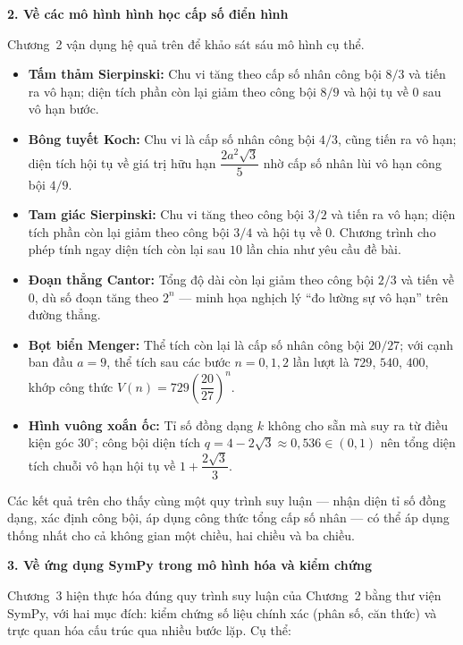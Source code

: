 \documentclass[12pt,a4paper,oneside]{book}
\theoremstyle{theorem}
\theoremstyle{definition}
\begin{document}
\vspace{0.4em}
\noindent\textbf{2. Về các mô hình hình học cấp số điển hình}

Chương~2 vận dụng hệ quả trên để khảo sát sáu mô hình cụ thể.

\begin{itemize}[leftmargin=1.5em, itemsep=3pt]
  \item \textbf{Tấm thảm Sierpinski:} Chu vi tăng theo cấp số nhân công bội $8/3$ và tiến ra vô hạn; diện tích phần còn lại giảm theo công bội $8/9$ và hội tụ về $0$ sau vô hạn bước.
  \item \textbf{Bông tuyết Koch:} Chu vi là cấp số nhân công bội $4/3$, cũng tiến ra vô hạn; diện tích hội tụ về giá trị hữu hạn $\dfrac{2a^2\sqrt{3}}{5}$ nhờ cấp số nhân lùi vô hạn công bội $4/9$.
  \item \textbf{Tam giác Sierpinski:} Chu vi tăng theo công bội $3/2$ và tiến ra vô hạn; diện tích phần còn lại giảm theo công bội $3/4$ và hội tụ về $0$. Chương trình cho phép tính ngay diện tích còn lại sau $10$ lần chia như yêu cầu đề bài.
  \item \textbf{Đoạn thẳng Cantor:} Tổng độ dài còn lại giảm theo công bội $2/3$ và tiến về $0$, dù số đoạn tăng theo $2^n$ --- minh họa nghịch lý ``đo lường sự vô hạn'' trên đường thẳng.
  \item \textbf{Bọt biển Menger:} Thể tích còn lại là cấp số nhân công bội $20/27$; với cạnh ban đầu $a=9$, thể tích sau các bước $n=0,1,2$ lần lượt là $729$, $540$, $400$, khớp công thức $V(n)=729\left(\dfrac{20}{27}\right)^n$.
  \item \textbf{Hình vuông xoắn ốc:} Tỉ số đồng dạng $k$ không cho sẵn mà suy ra từ điều kiện góc $30^\circ$; công bội diện tích $q=4-2\sqrt{3}\approx 0{,}536\in(0,1)$ nên tổng diện tích chuỗi vô hạn hội tụ về $1+\dfrac{2\sqrt{3}}{3}$.
\end{itemize}

Các kết quả trên cho thấy cùng một quy trình suy luận --- nhận diện tỉ số đồng dạng, xác định công bội, áp dụng công thức tổng cấp số nhân --- có thể áp dụng thống nhất cho cả không gian một chiều, hai chiều và ba chiều.

\vspace{0.4em}
\noindent\textbf{3. Về ứng dụng SymPy trong mô hình hóa và kiểm chứng}

Chương~3 hiện thực hóa đúng quy trình suy luận của Chương~2 bằng thư viện SymPy, với hai mục đích: kiểm chứng số liệu chính xác (phân số, căn thức) và trực quan hóa cấu trúc qua nhiều bước lặp. Cụ thể:
\end{document}
